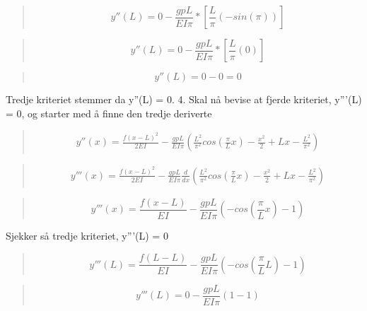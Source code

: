 \begin{quote}
\begin{equation*}
y''(L) = 0 - \frac{gpL}{EI\pi}* [\frac{L}{\pi} (-sin(\pi)) ]
\end{equation*}
\end{quote}

\begin{quote}
\begin{equation*}
y''(L) = 0 - \frac{gpL}{EI\pi}* [\frac{L}{\pi} (0) ]
\end{equation*}
\end{quote}

\begin{quote}
\begin{equation*}
y''(L) = 0 - 0 = 0
\end{equation*}
\end{quote}
Tredje kriteriet stemmer da y''(L) = 0.
4. Skal nå bevise at fjerde kriteriet, y'''(L) = 0, og starter med å finne den tredje deriverte
\begin{quote}
\begin{multline*}
y''(x) = \frac{f(x-L)^2}{2EI} - \frac{gpL}{EI\pi}(\frac{L^2}{\pi^2} cos(\frac{\pi}{L}x) - \frac{x^2}{2} + Lx - \frac{L^2}{\pi^2})
\end{multline*}
\end{quote}

\begin{quote}
\begin{multline*}
y'''(x) = \frac{f(x-L)^2}{2EI} - \frac{gpL}{EI\pi} \frac{d}{dx}(\frac{L^2}{\pi^2} cos(\frac{\pi}{L}x) - \frac{x^2}{2} + Lx - \frac{L^2}{\pi^2})
\end{multline*}
\end{quote}

\begin{quote}
\begin{equation}
y'''(x) = \frac{f(x-L)}{EI} - \frac{gpL}{EI\pi} (-cos(\frac{\pi}{L}x) - 1)
\end{equation}
\end{quote}
Sjekker så tredje kriteriet, y'''(L) = 0
\begin{quote}
\begin{equation*}
y'''(L) = \frac{f(L-L)}{EI} - \frac{gpL}{EI\pi} (-cos(\frac{\pi}{L}L) - 1)
\end{equation*}
\end{quote}

\begin{quote}
\begin{equation*}
y'''(L) = 0 - \frac{gpL}{EI\pi} (1 - 1)
\end{equation*}
\end{quote}

